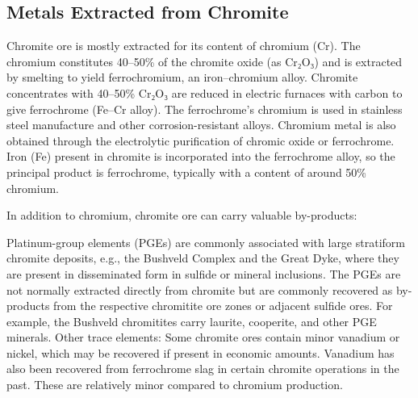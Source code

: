 \documentclass[12pt,a4paper, top=1.9cm, bottom=2.03cm, left=3.81cm, right=1.9cm]{article}
\begin{document}
\subsection{Metals Extracted from Chromite}
\noindent\fontsize{12}{14}\selectfont Chromite ore is mostly extracted for its content of chromium (Cr). The chromium constitutes 40–50\% of the chromite oxide (as Cr₂O₃) and is extracted by smelting to yield ferrochromium, an iron–chromium alloy. Chromite concentrates with 40–50\% Cr₂O₃ are reduced in electric furnaces with carbon to give ferrochrome (Fe–Cr alloy). The ferrochrome's chromium is used in stainless steel manufacture and other corrosion-resistant alloys. Chromium metal is also obtained through the electrolytic purification of chromic oxide or ferrochrome. Iron (Fe) present in chromite is incorporated into the ferrochrome alloy, so the principal product is ferrochrome, typically with a content of around 50\% chromium.

\noindent\fontsize{12}{14}\selectfont In addition to chromium, chromite ore can carry valuable by-products:

\noindent\fontsize{12}{14}\selectfont Platinum-group elements (PGEs) are commonly associated with large stratiform chromite deposits, e.g., the Bushveld Complex and the Great Dyke, where they are present in disseminated form in sulfide or mineral inclusions. The PGEs are not normally extracted directly from chromite but are commonly recovered as by-products from the respective chromitite ore zones or adjacent sulfide ores. For example, the Bushveld chromitites carry laurite, cooperite, and other PGE minerals.
\noindent\fontsize{12}{14}\selectfont Other trace elements: Some chromite ores contain minor vanadium or nickel, which may be recovered if present in economic amounts. Vanadium has also been recovered from ferrochrome slag in certain chromite operations in the past. These are relatively minor compared to chromium production.
\newpage
\end{document}
